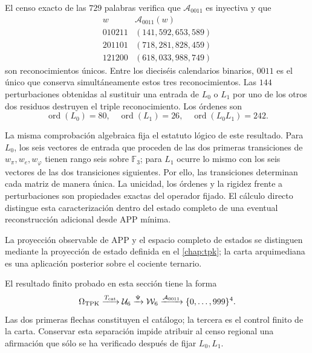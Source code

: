El censo exacto de las \(729\) palabras verifica que \(\mathcal A_{0011}\)
es inyectiva y que
\[
\begin{array}{c|c}
w&\mathcal A_{0011}(w)\\ \hline
010211&(141,592,653,589)\\
201101&(718,281,828,459)\\
121200&(618,033,988,749)
\end{array}
\]
son reconocimientos únicos. Entre los dieciséis calendarios binarios,
\(0011\) es el único que conserva simultáneamente estos tres
reconocimientos. Las \(144\) perturbaciones obtenidas al sustituir una entrada
de \(L_0\) o \(L_1\) por uno de los otros dos residuos destruyen el triple
reconocimiento. Los órdenes son
\[
\operatorname{ord}(L_0)=80,
\quad
\operatorname{ord}(L_1)=26,
\quad
\operatorname{ord}(L_0L_1)=242.
\]

La misma comprobación algebraica fija el estatuto lógico de este resultado.
Para \(L_0\), los seis vectores de entrada que proceden de las dos
primeras transiciones de \(w_\pi,w_e,w_\varphi\) tienen rango seis sobre
\(\mathbb F_3\); para \(L_1\) ocurre lo mismo con los seis vectores de las dos
transiciones siguientes. Por ello, las transiciones determinan cada matriz de
manera única. La unicidad, los órdenes y la rigidez frente a perturbaciones
son propiedades exactas del operador fijado. El cálculo directo distingue
esta caracterización dentro del estado completo de una eventual
reconstrucción adicional desde APP mínima.

La proyección observable de APP y el espacio completo de estados se distinguen
mediante la proyección de estado definida en el \cref{chap:tpk}; la carta
arquimediana es una aplicación posterior sobre el cociente ternario.

\begin{remark}
El resultado finito probado en esta sección tiene la forma
\[
\Omega_{\rm TPK}\xrightarrow{T_{\rm cat}}\mathcal U_6
\xrightarrow{\Psi}\mathcal W_6
\xrightarrow{\mathcal A_{0011}}\{0,\ldots,999\}^4.
\]
Las dos primeras flechas constituyen el catálogo; la tercera es el control
finito de la carta. Conservar esta separación impide atribuir al censo regional una
afirmación que sólo se ha verificado después de fijar \(L_0,L_1\).
\end{remark}

